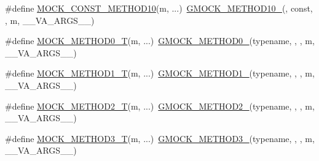 \begin{DoxyCompactItemize}
\item 
\#define \mbox{\hyperlink{_obj__test_2lib_2googletest-release-1_88_81_2googlemock_2include_2gmock_2gmock-generated-function-mockers_8h_a4f16ede0ef660fb6dc49e5f5d226fbf9}{M\+O\+C\+K\+\_\+\+C\+O\+N\+S\+T\+\_\+\+M\+E\+T\+H\+O\+D10}}(m, ...)~\mbox{\hyperlink{_obj__test_2lib_2googletest-release-1_88_81_2googlemock_2include_2gmock_2gmock-generated-function-mockers_8h_a81a48223a8771de36ef92ac6d56f6e81}{G\+M\+O\+C\+K\+\_\+\+M\+E\+T\+H\+O\+D10\+\_\+}}(, const, , m, \+\_\+\+\_\+\+V\+A\+\_\+\+A\+R\+G\+S\+\_\+\+\_\+)
\item 
\#define \mbox{\hyperlink{_obj__test_2lib_2googletest-release-1_88_81_2googlemock_2include_2gmock_2gmock-generated-function-mockers_8h_a55a5a1a22cec416ead5605a2da39eec8}{M\+O\+C\+K\+\_\+\+M\+E\+T\+H\+O\+D0\+\_\+T}}(m, ...)~\mbox{\hyperlink{_obj__test_2lib_2googletest-release-1_88_81_2googlemock_2include_2gmock_2gmock-generated-function-mockers_8h_ae0d290ffa58d7c624b2e3487ba1252f4}{G\+M\+O\+C\+K\+\_\+\+M\+E\+T\+H\+O\+D0\+\_\+}}(typename, , , m, \+\_\+\+\_\+\+V\+A\+\_\+\+A\+R\+G\+S\+\_\+\+\_\+)
\item 
\#define \mbox{\hyperlink{_obj__test_2lib_2googletest-release-1_88_81_2googlemock_2include_2gmock_2gmock-generated-function-mockers_8h_a8e5b9539726be5c7a13f1aa3bcc1f29f}{M\+O\+C\+K\+\_\+\+M\+E\+T\+H\+O\+D1\+\_\+T}}(m, ...)~\mbox{\hyperlink{_obj__test_2lib_2googletest-release-1_88_81_2googlemock_2include_2gmock_2gmock-generated-function-mockers_8h_a1bc0012d62440dda77208dabdf4925c9}{G\+M\+O\+C\+K\+\_\+\+M\+E\+T\+H\+O\+D1\+\_\+}}(typename, , , m, \+\_\+\+\_\+\+V\+A\+\_\+\+A\+R\+G\+S\+\_\+\+\_\+)
\item 
\#define \mbox{\hyperlink{_obj__test_2lib_2googletest-release-1_88_81_2googlemock_2include_2gmock_2gmock-generated-function-mockers_8h_adb6e8d8bd6ab614c62d8ecc2ec163e3c}{M\+O\+C\+K\+\_\+\+M\+E\+T\+H\+O\+D2\+\_\+T}}(m, ...)~\mbox{\hyperlink{_obj__test_2lib_2googletest-release-1_88_81_2googlemock_2include_2gmock_2gmock-generated-function-mockers_8h_a885295ca6bebb15efb3fc786218c5d47}{G\+M\+O\+C\+K\+\_\+\+M\+E\+T\+H\+O\+D2\+\_\+}}(typename, , , m, \+\_\+\+\_\+\+V\+A\+\_\+\+A\+R\+G\+S\+\_\+\+\_\+)
\item 
\#define \mbox{\hyperlink{_obj__test_2lib_2googletest-release-1_88_81_2googlemock_2include_2gmock_2gmock-generated-function-mockers_8h_a0b1576f68e6161f106e3d9ee7e3ac28b}{M\+O\+C\+K\+\_\+\+M\+E\+T\+H\+O\+D3\+\_\+T}}(m, ...)~\mbox{\hyperlink{_obj__test_2lib_2googletest-release-1_88_81_2googlemock_2include_2gmock_2gmock-generated-function-mockers_8h_af7c77ba511c631de02bb8c45a6ed3045}{G\+M\+O\+C\+K\+\_\+\+M\+E\+T\+H\+O\+D3\+\_\+}}(typename, , , m, \+\_\+\+\_\+\+V\+A\+\_\+\+A\+R\+G\+S\+\_\+\+\_\+)

\end{DoxyCompactItemize}
